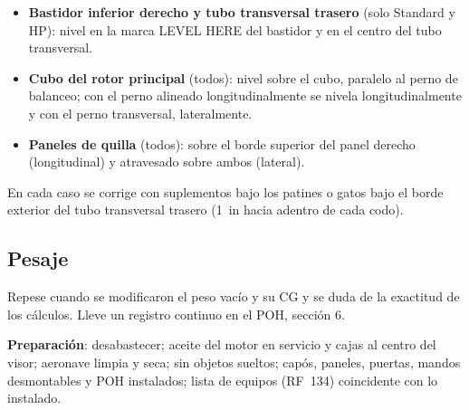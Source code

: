 \begin{itemize}
\item \textbf{Bastidor inferior derecho y tubo transversal trasero} (solo Standard y HP): nivel en la marca LEVEL HERE del bastidor y en el centro del tubo transversal.
\item \textbf{Cubo del rotor principal} (todos): nivel sobre el cubo, paralelo al perno de balanceo; con el perno alineado longitudinalmente se nivela longitudinalmente y con el perno transversal, lateralmente.
\item \textbf{Paneles de quilla} (todos): sobre el borde superior del panel derecho (longitudinal) y atravesado sobre ambos (lateral).
\end{itemize}

En cada caso se corrige con suplementos bajo los patines o gatos bajo el borde exterior del tubo transversal trasero (1~in hacia adentro de cada codo).

\subsection{Pesaje}

Repese cuando se modificaron el peso vacío y su CG y se duda de la exactitud de los cálculos. Lleve un registro continuo en el POH, sección 6.

\textbf{Preparación}: desabastecer; aceite del motor en servicio y cajas al centro del visor; aeronave limpia y seca; sin objetos sueltos; capós, paneles, puertas, mandos desmontables y POH instalados; lista de equipos (RF~134) coincidente con lo instalado.

